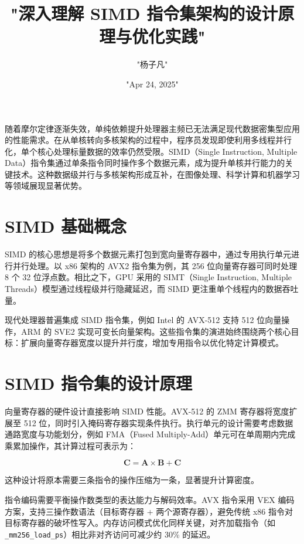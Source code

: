 \title{"深入理解 SIMD 指令集架构的设计原理与优化实践"}
\author{"杨子凡"}
\date{"Apr 24, 2025"}
\maketitle
随着摩尔定律逐渐失效，单纯依赖提升处理器主频已无法满足现代数据密集型应用的性能需求。在从单核转向多核架构的过程中，程序员发现即使利用多线程并行化，单个核心处理标量数据的效率仍然受限。SIMD（Single Instruction, Multiple Data）指令集通过单条指令同时操作多个数据元素，成为提升单核并行能力的关键技术。这种数据级并行与多核架构形成互补，在图像处理、科学计算和机器学习等领域展现显著优势。\par
\chapter{SIMD 基础概念}
SIMD 的核心思想是将多个数据元素打包到宽向量寄存器中，通过专用执行单元进行并行处理。以 x86 架构的 AVX2 指令集为例，其 256 位向量寄存器可同时处理 8 个 32 位浮点数。相比之下，GPU 采用的 SIMT（Single Instruction, Multiple Threads）模型通过线程级并行隐藏延迟，而 SIMD 更注重单个线程内的数据吞吐量。\par
现代处理器普遍集成 SIMD 指令集，例如 Intel 的 AVX-512 支持 512 位向量操作，ARM 的 SVE2 实现可变长向量架构。这些指令集的演进始终围绕两个核心目标：扩展向量寄存器宽度以提升并行度，增加专用指令以优化特定计算模式。\par
\chapter{SIMD 指令集的设计原理}
向量寄存器的硬件设计直接影响 SIMD 性能。AVX-512 的 ZMM 寄存器将宽度扩展至 512 位，同时引入掩码寄存器实现条件执行。执行单元的设计需要考虑数据通路宽度与功能划分，例如 FMA（Fused Multiply-Add）单元可在单周期内完成乘累加操作，其计算过程可表示为：\par
$$ \mathbf{C} = \mathbf{A} \times \mathbf{B} + \mathbf{C} $$\par
这种设计将原本需要三条指令的操作压缩为一条，显著提升计算密度。\par
指令编码需要平衡操作数类型的表达能力与解码效率。AVX 指令采用 VEX 编码方案，支持三操作数语法（目标寄存器 + 两个源寄存器），避免传统 x86 指令对目标寄存器的破坏性写入。内存访问模式优化同样关键，对齐加载指令（如 \verb!_mm256_load_ps!）相比非对齐访问可减少约 30\%{} 的延迟。\par
